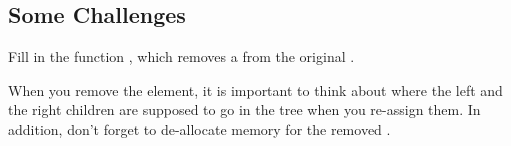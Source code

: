 \documentclass{tufte-handout}
\begin{document}
\subsection{Some Challenges}

Fill in the function , which removes a  from the original .

When you remove the element, it is important to think about where the left and the right children are supposed to go in the tree when you re-assign them.
In addition, don't forget to de-allocate memory for the removed .
\end{document}
